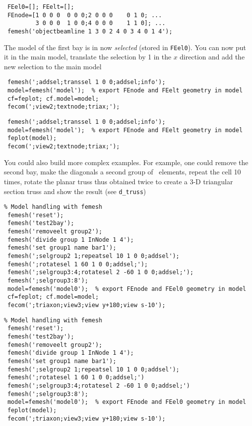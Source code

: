 \begin{verbatim}
 FEel0=[]; FEelt=[];
 FEnode=[1 0 0 0  0 0 0;2 0 0 0    0 1 0; ...
         3 0 0 0  1 0 0;4 0 0 0    1 1 0]; ...
 femesh('objectbeamline 1 3 0 2 4 0 3 4 0 1 4');
\end{verbatim}%


The model of the first bay is in now {\sl selected} (stored in {\tt FEel0}). You can now put it in the main model, translate the selection by 1 in the $x$ direction and add the new selection to the main model

\begin{SDT}
\begin{verbatim}
 femesh(';addsel;transsel 1 0 0;addsel;info');
 model=femesh('model');  % export FEnode and FEelt geometry in model
 cf=feplot; cf.model=model;
 fecom(';view2;textnode;triax;');
\end{verbatim}%
\end{SDT}

\begin{OPENFEM}
\begin{verbatim}
 femesh(';addsel;transsel 1 0 0;addsel;info');
 model=femesh('model');  % export FEnode and FEelt geometry in model
 feplot(model);
 fecom(';view2;textnode;triax;');
\end{verbatim}%
\end{OPENFEM}

You could also build more complex examples. For example, one could remove the second bay, make the diagonals a second group of \bare\ elements, repeat the cell 10 times, rotate the planar truss thus obtained twice to create a 3-D triangular section truss and show the result (see {\tt d\_truss})

\begin{SDT}
\begin{verbatim}
% Model handling with femesh
 femesh('reset');
 femesh('test2bay');
 femesh('removeelt group2');
 femesh('divide group 1 InNode 1 4');
 femesh('set group1 name bar1');
 femesh(';selgroup2 1;repeatsel 10 1 0 0;addsel');
 femesh(';rotatesel 1 60 1 0 0;addsel;');
 femesh(';selgroup3:4;rotatesel 2 -60 1 0 0;addsel;');
 femesh(';selgroup3:8');
 model=femesh('model0');  % export FEnode and FEel0 geometry in model
 cf=feplot; cf.model=model;
 fecom(';triaxon;view3;view y+180;view s-10');
\end{verbatim}%
\end{SDT}

\begin{OPENFEM}
\begin{verbatim}
% Model handling with femesh
 femesh('reset');
 femesh('test2bay');
 femesh('removeelt group2');
 femesh('divide group 1 InNode 1 4');
 femesh('set group1 name bar1');
 femesh(';selgroup2 1;repeatsel 10 1 0 0;addsel');
 femesh(';rotatesel 1 60 1 0 0;addsel;')
 femesh(';selgroup3:4;rotatesel 2 -60 1 0 0;addsel;')
 femesh(';selgroup3:8');
 model=femesh('model0');  % export FEnode and FEel0 geometry in model
 feplot(model);
 fecom(';triaxon;view3;view y+180;view s-10');
\end{verbatim}%
\end{OPENFEM}

